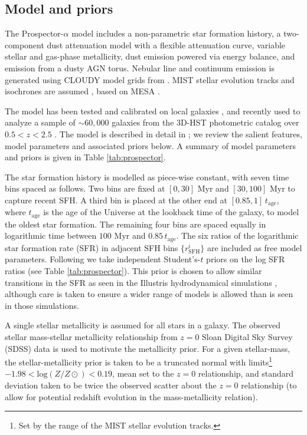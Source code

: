 \documentclass[twocolumn]{aastex62}
\begin{document}
\subsection{Model and priors}
\label{sec:prospector_model}
%
The Prospector-$\alpha$ model includes a non-parametric star formation history, a two-component dust attenuation model with a flexible attenuation curve, variable stellar and gas-phase metallicity, dust emission powered via energy balance, and emission from a dusty AGN torus. Nebular line and continuum emission is generated using CLOUDY \citep{ferland2013} model grids from \citet{byler2017}. MIST stellar evolution tracks and isochrones are assumed \citep{choi2016, dotter2016}, based on MESA \citep{paxton2010, paxton2013, paxton2015}.

The model has been tested and calibrated on local galaxies \citep{leja2017, leja2018}, and recently used to analyze a sample of $\sim 60,000$ galaxies from the 3D-HST photometric catalog \citep{skelton2014} over $0.5<z<2.5$ \citep{leja2019}. The model is described in detail in \citet{leja2017, leja2018, leja2019}; we review the salient features, model parameters and associated priors below. A summary of model parameters and priors is given in Table \ref{tab:prospector}.

The star formation history is modelled as piece-wise constant, with seven time bins spaced as follows. Two bins are fixed at $[0,30]$ $\mathrm{Myr}$ and $[30,100]$ $\mathrm{Myr}$ to capture recent SFH. A third bin is placed at the other end at $[0.85, 1]\,t_\mathrm{age}$, where $t_\mathrm{age}$ is the age of the Universe at the lookback time of the galaxy, to model the oldest star formation. The remaining four bins are spaced equally in logarithmic time between $100$ $\mathrm{Myr}$ and $0.85\,t_\mathrm{age}$. The six ratios of the logarithmic star formation rate (SFR) in adjacent SFH bins $\{r_\mathrm{SFH}^i\}$ are included as free model parameters. Following \citet{leja2017, leja2018, leja2019} we take independent Student's-$t$ priors on the log SFR ratios (see Table \ref{tab:prospector}). This prior is chosen to allow similar transitions in the SFR as seen in the Illustris hydrodynamical simulations \citep{vogelsberger2014a, vogelsberger2014b, torrey2014, diemer2017}, although care is taken to ensure a wider range of models is allowed than is seen in those simulations.

A single stellar metallicity is assumed for all stars in a galaxy. The observed stellar mass-stellar metallicity relationship from $z = 0$ Sloan Digital Sky Survey (SDSS) data \citep{gallazzi2005} is used to motivate the metallicity prior. For a given stellar-mass, the stellar-metallicity prior is taken to be a truncated normal with limits\footnote{Set by the range of the MIST stellar evolution tracks.} $−1.98 < \mathrm{log}(Z/Z\odot) < 0.19$, mean set to the \citet{gallazzi2005} $z = 0$ relationship, and standard deviation taken to be twice the observed scatter about the $z=0$ relationship (to allow for potential redshift evolution in the mass-metallicity relation).
\end{document}
